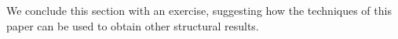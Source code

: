 \documentclass[runningheads]{llncs}
\def\LH{\Upsilon}
\begin{document}

We conclude this section with an exercise, suggesting how the techniques of this paper
can be used to obtain other structural results.
\end{document}
